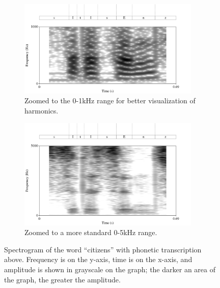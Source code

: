 \documentclass[dissertation,copyright]{uathesis}
\begin{document}
\begin{figure}[h!]
\begin{subfigure}{0.95\textwidth}
  \centering
  \includegraphics[width=0.95\textwidth]{figure/spctgrm1k.png}
  \caption{Zoomed to the 0-1kHz range for better visualization of harmonics.}
  \label{fig:spctgrm_citizen_1k}
\end{subfigure}%
\hfill
\begin{subfigure}{0.95\textwidth}
  \centering
  \includegraphics[width=0.95\textwidth]{figure/spctgrm5k.png}
  \caption{Zoomed to a more standard 0-5kHz range.}
  \label{fig:spctgrm_citizen_5k}
\end{subfigure}
\caption{Spectrogram of the word ``citizens'' with phonetic transcription above.  Frequency is on the y-axis, time is on the x-axis, and amplitude is shown in grayscale on the graph; the darker an area of the graph, the greater the amplitude.}
\label{fig:spctgrm_citizen}
\end{figure}
\end{document}
